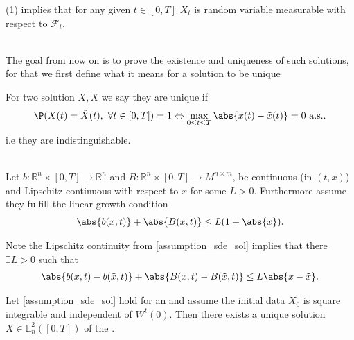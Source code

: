 \begin{remark}
  (1) implies that for any given $t \in  [0,T]$ $X_t$ is random variable measurable with respect to $\mathcal{F}_t$.
\end{remark}
\hspace{0mm}\\
The goal from now on is to prove the existence and uniqueness of such solutions, for that we first define what it means 
for a solution to be unique
\begin{definition}
 For two solution $X,\tilde{X} $ we say they are unique if
 \begin{align*}
   \P(X(t) = \tilde{X}(t), \ \forall  t \in  [0,T] ) = 1 \Leftrightarrow \max_{0\le t \le T} \abs{x(t)-\tilde{x}(t) }  = 0 \text{ a.s.}
 .\end{align*}
 i.e they are indistinguishable.
\end{definition}
\begin{assumption}\label{assumption_sde_sol}\hspace{0mm}\\
  Let $b : \mathbb{R}^{n} \times  [0,T] \to  \mathbb{R}^{n}  $ and 
  $B : \mathbb{R}^{n} \times  [0,T] \to  M^{n \times m}  $,
  be continuous (in $(t,x)$) and Lipschitz continuous with respect to $x$ for some $L > 0$.
  Furthermore assume they fulfill the linear growth condition
  \begin{align*}
    \abs{b(x,t)} + \abs{B(x,t)} \le  L(1+\abs{x}) 
  .\end{align*}
\end{assumption}
\begin{remark}
  Note the Lipschitz continuity from \autoref{assumption_sde_sol} implies that there $\exists L >0$ such that
  \begin{align*}
    \abs{b(x,t) - b(\tilde{x},t )} +  \abs{B(x ,t) - B(\tilde{x},t )} \le  L \abs{x - \tilde{x} }
  .\end{align*}
\end{remark}
\begin{theorem}\label{sde_solution_theorem}
  Let \autoref{assumption_sde_sol} hold for an  and assume the initial data $X_0$ is  
  square integrable and independent of $W^{t}(0)$.
  Then there exists a unique solution $X \in  \mathbb{L}^2_n([0,T])$ of the .
\end{theorem}
